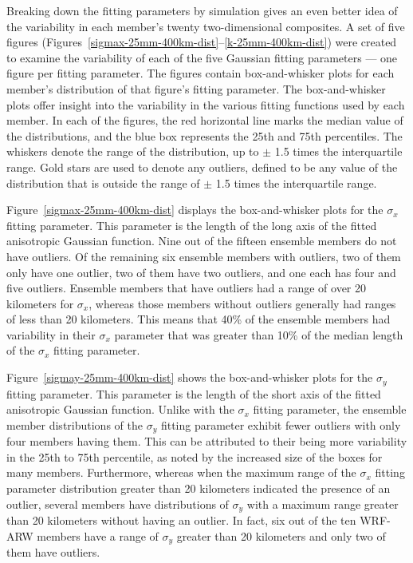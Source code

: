Breaking down the fitting parameters by simulation gives an even better idea of the variability in each member's twenty two-dimensional composites.
A set of five figures (\mbox{Figures \ref{sigmax-25mm-400km-dist}--\ref{k-25mm-400km-dist}}) were created to examine the variability of each of the five Gaussian fitting parameters --- one figure per fitting parameter.
The figures contain box-and-whisker plots for each member's distribution of that figure's fitting parameter.
The box-and-whisker plots offer insight into the variability in the various fitting functions used by each member.
In each of the figures, the red horizontal line marks the median value of the distributions, and the blue box represents the 25th and 75th percentiles.
The whiskers denote the range of the distribution, up to $\pm$ 1.5 times the interquartile range.
Gold stars are used to denote any outliers, defined to be any value of the distribution that is outside the range of $\pm$ 1.5 times the interquartile range.


\mbox{Figure \ref{sigmax-25mm-400km-dist}} displays the box-and-whisker plots for the $\sigma_x$ fitting parameter.
This parameter is the length of the long axis of the fitted anisotropic Gaussian function.
Nine out of the fifteen ensemble members do not have outliers.
Of the remaining six ensemble members with outliers, two of them only have one outlier, two of them have two outliers, and one each has four and five outliers.
Ensemble members that have outliers had a range of over 20 kilometers for $\sigma_x$, whereas those members without outliers generally had ranges of less than 20 kilometers.
This means that 40\% of the ensemble members had variability in their $\sigma_x$ parameter that was greater than 10\% of the median length of the $\sigma_x$ fitting parameter.


\mbox{Figure \ref{sigmay-25mm-400km-dist}} shows the box-and-whisker plots for the $\sigma_y$ fitting parameter.
This parameter is the length of the short axis of the fitted anisotropic Gaussian function.
Unlike with the $\sigma_x$ fitting parameter, the ensemble member distributions of the $\sigma_y$ fitting parameter exhibit fewer outliers with only four members having them.
This can be attributed to their being more variability in the 25th to 75th percentile, as noted by the increased size of the boxes for many members.
Furthermore, whereas when the maximum range of the $\sigma_x$ fitting parameter distribution greater than 20 kilometers indicated the presence of an outlier, several members have distributions of $\sigma_y$ with a maximum range greater than 20 kilometers without having an outlier.
In fact, six out of the ten WRF-ARW members have a range of $\sigma_y$ greater than 20 kilometers and only two of them have outliers.


